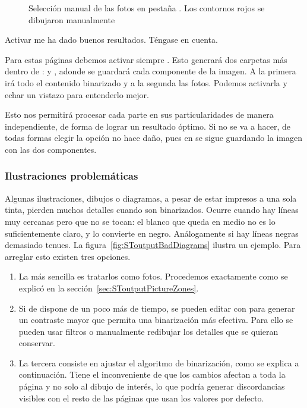 \documentclass[%
	a5paper,
	10pt,
	twoside,
	openright,
	final,
]{memoir}
\begin{document}
	\begin{figure}
		\caption[Selección manual de las fotos en pestaña Picture Zones]{Selección manual de las fotos en pestaña . Los contornos rojos se dibujaron manualmente\label{fig:SToutputPicureZonesFree}}
	\end{figure}

	Activar  me ha dado buenos resultados. Téngase en cuenta.

	Para estas páginas debemos activar siempre . Esto generará dos carpetas más dentro de :  y , adonde se guardará cada componente de la imagen. A la primera irá todo el contenido binarizado y a la segunda las fotos. Podemos activarla y echar un vistazo para entenderlo mejor.

	Esto nos permitirá procesar cada parte en sus particularidades de manera independiente, de forma de lograr un resultado óptimo. Si no se va a hacer, de todas formas elegir la opción no hace daño, pues en  se sigue guardando la imagen con las dos componentes.

	\subsubsection{Ilustraciones problemáticas} Algunas ilustraciones, dibujos o diagramas, a pesar de estar impresos a una sola tinta, pierden muchos detalles cuando son binarizados. Ocurre cuando hay líneas muy cercanas pero que no se tocan: el blanco que queda en medio no es lo suficientemente claro, y \scantailor lo convierte en negro. Análogamente si hay líneas negras demasiado tenues. La figura~\ref{fig:SToutputBadDiagrams} ilustra un ejemplo. Para arreglar esto existen tres opciones.

	\begin{enumerate}[noitemsep]
		\item La más sencilla es tratarlos como fotos. Procedemos exactamente como se explicó en la sección~\ref{sec:SToutputPictureZones}.
		\item Si de dispone de un poco más de tiempo, se pueden editar con \gimp para generar un contraste mayor que permita una binarización más efectiva. Para ello se pueden usar filtros o manualmente redibujar los detalles que se quieran conservar.
		\item La tercera consiste en ajustar el algoritmo de binarización, como se explica a continuación. Tiene el inconveniente de que los cambios afectan a toda la página y no solo al dibujo de interés, lo que podría generar discordancias visibles con el resto de las páginas que usan los valores por defecto.
	\end{enumerate}
\end{document}
